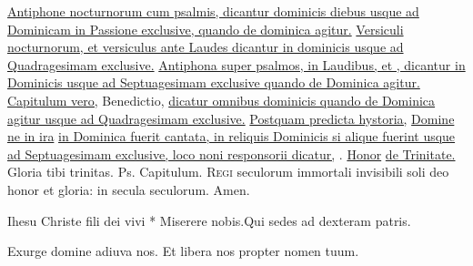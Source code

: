 \begin{multicols*}{2}
\newline \ul{Antiphone nocturnorum cum psalmis, dicantur dominicis diebus usque ad Dominicam in Passione exclusive, quando de dominica agitur.}
\newline \ul{Versiculi nocturnorum, et versiculus ante Laudes dicantur in dominicis usque ad Quadragesimam exclusive.}
\newline \ul{Antiphona super psalmos, in Laudibus, et \Vbar , dicantur in Dominicis usque ad Septuagesimam exclusive quando de Dominica agitur.}
\newline \ul{Capitulum vero,} Benedictio, \ul{dicatur omnibus dominicis quando de Dominica agitur usque ad Quadragesimam exclusive.}
\newline \ul{Postquam predicta hystoria,} \hyperlink{domine-ne-in-ira}{Domine ne in ira} \ul{in Dominica fuerit cantata, in reliquis Dominicis si alique fuerint usque ad Septuagesimam exclusive, loco noni responsorii dicatur,} \Rbar . \hyperlink{honor-virtus}{Honor} \ul{de Trinitate.}
 Gloria tibi trinitas. {\color{Red} Ps.}     {\color{Red} Capitulum.}
\lettrine[lines=2]{\zallmancaps \color{Blue} R}{egi} seculorum immortali invisibili soli deo honor et gloria: in secula seculorum. Amen.
\begin{responsory-breve}
{Ihesu Christe fili dei vivi * Miserere nobis.}{Qui sedes ad dexteram patris.}
\end{responsory-breve}
\newline \V Exurge domine adiuva nos.
\newline \R Et libera nos propter nomen tuum.

\end{multicols*}
